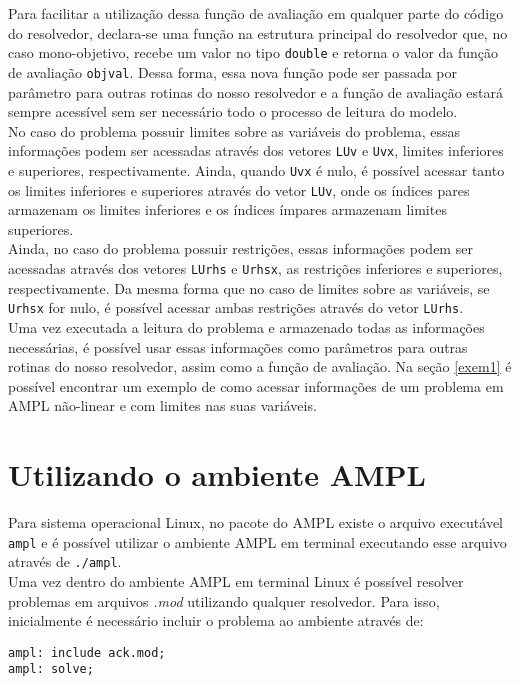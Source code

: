 \documentclass[a4paper, 12pt]{article}
\begin{document}
Para facilitar a utilização dessa função de avaliação em qualquer parte do código do resolvedor, declara-se uma função na estrutura principal do resolvedor que, no caso mono-objetivo, recebe um valor no tipo \verb|double| e retorna o valor da função de avaliação \verb|objval|. Dessa forma, essa nova função pode ser passada por parâmetro para outras rotinas do nosso resolvedor e a função de avaliação estará sempre acessível sem ser necessário todo o processo de leitura do modelo.\\ 

No caso do problema possuir limites sobre as variáveis do problema, essas informações podem ser acessadas através dos vetores \verb|LUv| e \verb|Uvx|, limites inferiores e superiores, respectivamente. Ainda, quando \verb|Uvx| é nulo, é possível acessar tanto os limites inferiores e superiores através do vetor \verb|LUv|, onde os índices pares armazenam os limites inferiores e os índices ímpares armazenam limites superiores.\\

Ainda, no caso do problema possuir restrições, essas informações podem ser acessadas através dos vetores \verb|LUrhs| e \verb|Urhsx|, as restrições inferiores e superiores, respectivamente. Da mesma forma que no caso de limites sobre as variáveis, se \verb|Urhsx| for nulo, é possível acessar ambas restrições através do vetor \verb|LUrhs|.\\

Uma vez executada a leitura do problema e armazenado todas as informações necessárias, é possível usar essas informações como parâmetros para outras rotinas do nosso resolvedor, assim como a função de avaliação. Na seção \ref{exem1} é possível encontrar um exemplo de como acessar informações de um problema em AMPL não-linear e com limites nas suas variáveis.

\section{Utilizando o ambiente AMPL}
Para sistema operacional Linux, no pacote do AMPL existe o arquivo executável \verb|ampl| e é possível utilizar o ambiente AMPL em terminal executando esse arquivo através de \verb|./ampl|.\\

Uma vez dentro do ambiente AMPL em terminal Linux é possível resolver problemas em arquivos \textit{.mod} utilizando qualquer resolvedor. Para isso, inicialmente é necessário incluir o problema ao ambiente através de:
\begin{verbatim}
ampl: include ack.mod;
ampl: solve;
\end{verbatim}
\end{document}
